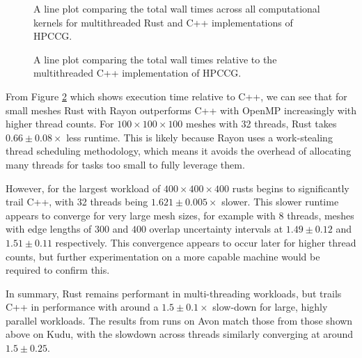 \begin{figure}[H]
    \centering
    
    \caption{A line plot comparing the total wall times across all computational kernels for multithreaded Rust and C++ implementations of HPCCG.}
    \label{fig:5_parallel_line_all}
\end{figure}

\begin{figure}[H]
    \centering
    
    \caption{A line plot comparing the total wall times relative to the multithreaded C++ implementation of HPCCG.}
    \label{fig:7_parallel_line_relative}
\end{figure}


From Figure \ref{fig:7_parallel_line_relative} which shows execution time relative to C++, we can see that for small meshes Rust with Rayon outperforms C++ with OpenMP increasingly with higher thread counts. For $100 \times 100 \times 100$ meshes with 32 threads, Rust takes $0.66 \pm 0.08 \times$ less runtime. This is likely because Rayon uses a work-stealing thread scheduling methodology, which means it avoids the overhead of allocating many threads for tasks too small to fully leverage them.

However, for the largest workload of $400 \times 400 \times 400$ rusts begins to significantly trail C++, with 32 threads being $1.621 \pm 0.005 \times$ slower. This slower runtime appears to converge for very large mesh sizes, for example with 8 threads, meshes with edge lengths of $300$ and $400$ overlap uncertainty intervals at $1.49 \pm 0.12$ and $1.51 \pm 0.11$ respectively. This convergence appears to occur later for higher thread counts, but further experimentation on a more capable machine would be required to confirm this.

In summary, Rust remains performant in multi-threading workloads, but trails C++ in performance with around a $1.5 \pm 0.1\times$ slow-down for large, highly parallel workloads. The results from runs on Avon match those from those shown above on Kudu, with the slowdown across threads similarly converging at around $1.5 \pm 0.25$.

